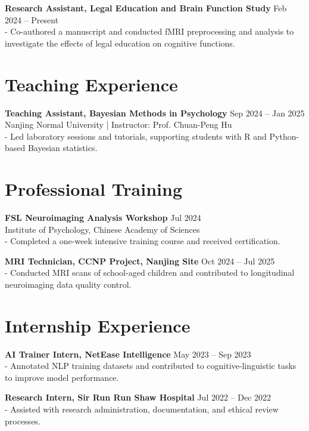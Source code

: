 \documentclass[11pt,a4paper]{article}
\begin{document}
\textbf{Research Assistant, Legal Education and Brain Function Study} \hfill Feb 2024 -- Present \\
- Co-authored a manuscript and conducted fMRI preprocessing and analysis to investigate the effects of legal education on cognitive functions.

\vspace{0.5cm}

\section*{Teaching Experience}

\textbf{Teaching Assistant, Bayesian Methods in Psychology} \hfill Sep 2024 -- Jan 2025 \\
Nanjing Normal University | Instructor: Prof. Chuan-Peng Hu \\
- Led laboratory sessions and tutorials, supporting students with R and Python-based Bayesian statistics.

\vspace{0.5cm}

\section*{Professional Training}

\textbf{FSL Neuroimaging Analysis Workshop} \hfill Jul 2024 \\
Institute of Psychology, Chinese Academy of Sciences \\
- Completed a one-week intensive training course and received certification.

\textbf{MRI Technician, CCNP Project, Nanjing Site} \hfill Oct 2024 -- Jul 2025 \\
- Conducted MRI scans of school-aged children and contributed to longitudinal neuroimaging data quality control.

\vspace{0.5cm}

\section*{Internship Experience}

\textbf{AI Trainer Intern, NetEase Intelligence} \hfill May 2023 -- Sep 2023 \\
- Annotated NLP training datasets and contributed to cognitive-linguistic tasks to improve model performance.

\textbf{Research Intern, Sir Run Run Shaw Hospital} \hfill Jul 2022 -- Dec 2022 \\
- Assisted with research administration, documentation, and ethical review processes.
\end{document}
